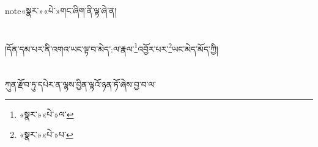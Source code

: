 note{«སྣར་»«པེ་»གང་ཞིག་}ནི་ལྟ་ཞེ་ན།\chapter{ }།དོན་དམ་པར་ནི་འགའ་ཡང་ལྟ་བ་མེད་:ལ་རྣལ་\footnote{«སྣར་»«པེ་»ལ་}འབྱོར་པར་\footnote{«སྣར་»«པེ་»པ་}ཡང་མེད་མོད་ཀྱི།\chapter{ }ཀུན་རྫོབ་ཏུ་དཔེར་ན་ལྷས་བྱིན་ལྟའོ་ཉན་ཏོ་ཞེས་བྱ་བ་ལ་